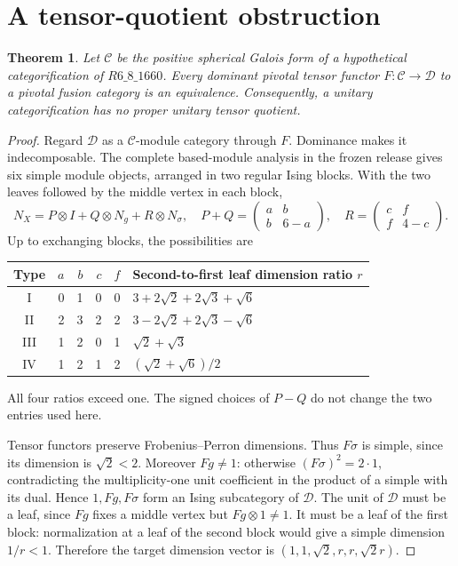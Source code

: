 \documentclass[10pt]{article}
\newtheorem{theorem}{Theorem}
\newcommand{\C}{\mathcal C}
\newcommand{\D}{\mathcal D}
\begin{document}
\section{A tensor-quotient obstruction}
\begin{theorem}
Let $\C$ be the positive spherical Galois form of a hypothetical categorification of $R6\_8\_1660$. Every dominant pivotal tensor functor $F:\C\to\D$ to a pivotal fusion category is an equivalence. Consequently, a unitary categorification has no proper unitary tensor quotient.
\end{theorem}
\begin{proof}
Regard $\D$ as a $\C$-module category through $F$. Dominance makes it indecomposable. The complete based-module analysis in the frozen release gives six simple module objects, arranged in two regular Ising blocks. With the two leaves followed by the middle vertex in each block,
\[
 N_X=P\otimes I+Q\otimes N_g+R\otimes N_\sigma,\quad
 P+Q=\begin{pmatrix}a&b\\b&6-a\end{pmatrix},\quad
 R=\begin{pmatrix}c&f\\f&4-c\end{pmatrix}.
\]
Up to exchanging blocks, the possibilities are
\begin{center}
\begin{tabular}{c@{\qquad}rrrr@{\qquad}l}
\toprule
Type&$a$&$b$&$c$&$f$&Second-to-first leaf dimension ratio $r$\\
\midrule
I&0&1&0&0&$3+2\sqrt2+2\sqrt3+\sqrt6$\\
II&2&3&2&2&$3-2\sqrt2+2\sqrt3-\sqrt6$\\
III&1&2&0&1&$\sqrt2+\sqrt3$\\
IV&1&2&1&2&$(\sqrt2+\sqrt6)/2$\\
\bottomrule
\end{tabular}
\end{center}
All four ratios exceed one. The signed choices of $P-Q$ do not change the two entries used here.

Tensor functors preserve Frobenius--Perron dimensions. Thus $F\sigma$ is simple, since its dimension is $\sqrt2<2$. Moreover $Fg\ne1$: otherwise $(F\sigma)^2=2\cdot1$, contradicting the multiplicity-one unit coefficient in the product of a simple with its dual. Hence $1,Fg,F\sigma$ form an Ising subcategory of $\D$. The unit of $\D$ must be a leaf, since $Fg$ fixes a middle vertex but $Fg\otimes1\ne1$. It must be a leaf of the first block: normalization at a leaf of the second block would give a simple dimension $1/r<1$. Therefore the target dimension vector is $(1,1,\sqrt2,r,r,\sqrt2r)$.


\end{proof}
\end{document}

